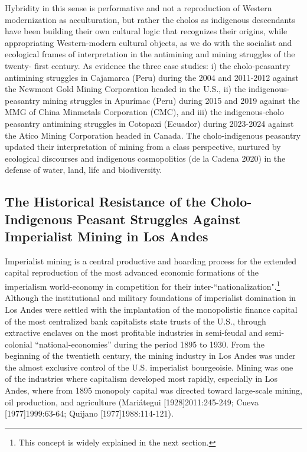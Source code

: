\documentclass[]{interact}
\theoremstyle{plain}%
\theoremstyle{definition}
\theoremstyle{remark}
\begin{document}
Hybridity in this sense is performative and not a reproduction of Western modernization as acculturation, but rather the cholos as indigenous descendants have been building their own cultural logic that recognizes their origins, while appropriating Western-modern cultural objects, as we do with the socialist and ecological frames of interpretation in the antimining and mining struggles of the twenty- first century. As evidence the three case studies: i) the cholo-peasantry antimining struggles in Cajamarca (Peru) during the 2004 and 2011-2012 against the Newmont Gold Mining Corporation headed in the U.S., ii) the indigenous-peasantry mining struggles in Apurímac (Peru) during 2015 and 2019 against the MMG of China Minmetals Corporation (CMC), and iii) the indigenous-cholo peasantry antimining struggles in Cotopaxi (Ecuador) during 2023-2024 against the Atico Mining Corporation headed in Canada. The cholo-indigenous peasantry updated their interpretation of mining from a class perspective, nurtured by ecological discourses and indigenous cosmopolitics (de la Cadena 2020) in the defense of water, land, life and biodiversity.

\subsection{The Historical Resistance of the Cholo-Indigenous Peasant Struggles Against Imperialist Mining in Los Andes}

Imperialist mining is a central productive and hoarding process for the extended capital reproduction of the most advanced economic formations of the imperialism world-economy in competition for their inter-“nationalization".\footnote{This concept is widely explained in the next section.}
Although the institutional and military foundations of imperialist domination in Los Andes were settled with the implantation of the monopolistic finance capital of the most centralized bank capitalists state trusts of the U.S., through extractive enclaves on the most profitable industries in semi-feudal and semi-colonial “national-economies” during the period 1895 to 1930. From the beginning of the twentieth century, the mining industry in Los Andes was under the almost exclusive control of the U.S. imperialist bourgeoisie. Mining was one of the industries where capitalism developed most rapidly, especially in Los Andes, where from 1895 monopoly capital was directed toward large-scale mining, oil production, and agriculture (Mariátegui [1928]2011:245-249; Cueva [1977]1999:63-64; Quijano [1977]1988:114-121).
\end{document}
